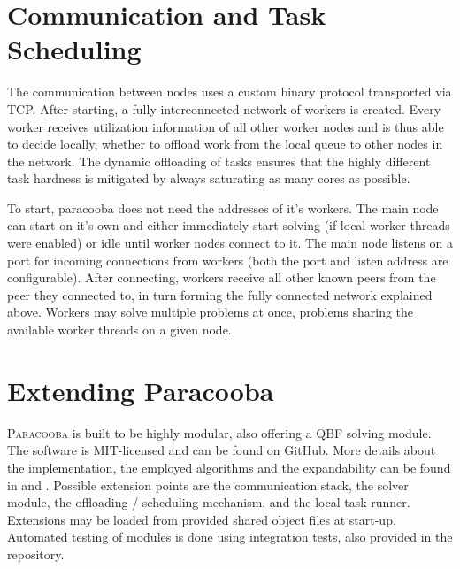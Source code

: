 \documentclass[conference]{IEEEtran}
\newcommand{\paracooba}{\textsc{Paracooba}}
\begin{document}
\section{Communication and Task Scheduling}

The communication between nodes uses a custom binary protocol transported via
TCP. After starting, a fully interconnected network of workers is created.
Every worker receives utilization information of all other worker nodes and is
thus able to decide locally, whether to offload work from the local queue to
other nodes in the network. The dynamic offloading of tasks ensures that the
highly different task hardness is mitigated by always saturating as many cores
as possible.

To start, paracooba does not need the addresses of it's workers. The main node
can start on it's own and either immediately start solving (if local worker
threads were enabled) or idle until worker nodes connect to it. The main node
listens on a port for incoming connections from workers (both the port and
listen address are configurable). After connecting, workers receive all other
known peers from the peer they connected to, in turn forming the fully connected
network explained above.  Workers may solve multiple problems at once, problems
sharing the available worker threads on a given node.

\section{Extending Paracooba}

\paracooba{} is built to be highly modular, also offering a QBF solving module.
The software is MIT-licensed and can be found on GitHub. More details about the
implementation, the employed algorithms and the expandability can be found in
\cite{paracooba} and \cite{heisinger2021distributed}. Possible extension points
are the communication stack, the solver module, the offloading / scheduling
mechanism, and the local task runner. Extensions may be loaded from provided
shared object files at start-up. Automated testing of modules is done using
integration tests, also provided in the repository.

\begin{thebibliography}{00}
\end{thebibliography}
\end{document}
